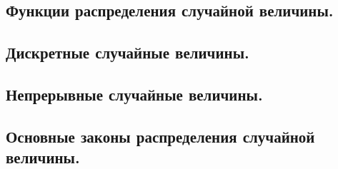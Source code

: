 \subsection{Функции распределения случайной величины.}



\newpage
\subsection{Дискретные случайные величины.}



\newpage
\subsection{Непрерывные случайные величины.}



\newpage
\subsection{Основные законы распределения случайной величины.}
